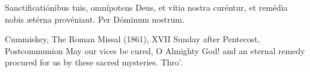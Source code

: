 
\begin{latinproper}
Sanctificatiónibus tuis, omnípotens Deus, et vítia nostra curéntur, et
remédia nobis ætérna provéniant. Per Dóminum nostrum.
\end{latinproper}

\begin{englishwitness}{Cummiskey, The Roman Missal (1861), XVII Sunday after Pentecost, Postcommunion}
May our vices be cured, O Almighty God! and an eternal remedy procured for us
by these sacred mysteries. Thro'.
\end{englishwitness}
